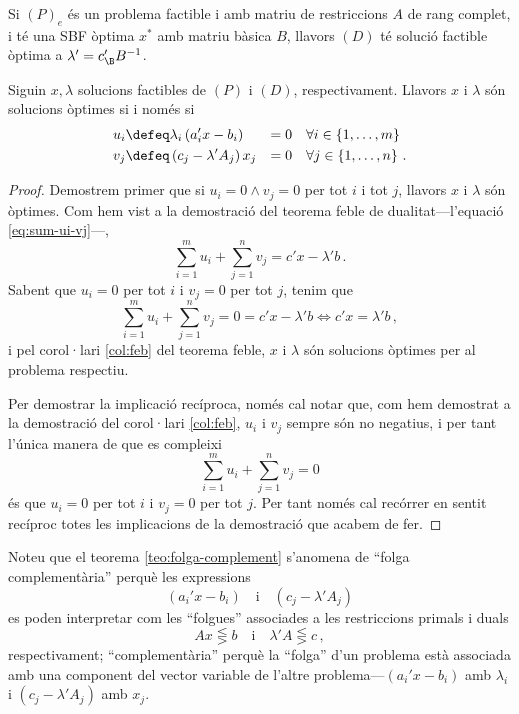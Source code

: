 \begin{col}
    Si $\left(P\right)_e$ és un problema factible i amb matriu de restriccions $A$ de rang complet, i té una SBF òptima $x^\ast$ amb matriu bàsica $B$, llavors $\left(D\right)$ té solució factible òptima a $\lambda' = c_\B'B^{-1}$.
\end{col}

\begin{teo}\label{teo:folga-complement}
    Siguin $x, \lambda$ solucions factibles de $\left(P\right)$ i $\left(D\right)$, respectivament. Llavors $x$ i $\lambda$ són solucions òptimes si i només si
    \begin{alignat*}{2}{}
        u_i &\defeq \lambda_i \left(a_i'x - b_i\right) &= 0 &\quad \forall i \in \left\{1, \dots, m\right\} \\
        v_j &\defeq \left(c_j - \lambda'A_j\right) x_j &= 0 &\quad \forall j \in \left\{1, \dots, n\right\}\,.
    \end{alignat*}
    \begin{proof}
    	Demostrem primer que si $u_i = 0 \land v_j = 0$ per tot $i$ i tot $j$, llavors $x$ i $\lambda$ són òptimes. Com hem vist a la demostració del teorema feble de dualitat---l'equació \eqref{eq:sum-ui-vj}---, 
    	\begin{equation*}
	    	\sum_{i = 1}^{m} u_i + \sum_{j = 1}^{n} v_j = c'x - \lambda'b\,.
    	\end{equation*}
    	Sabent que $u_i = 0$ per tot $i$ i $v_j = 0$ per tot $j$, tenim que \[\sum_{i = 1}^{m} u_i + \sum_{j = 1}^{n} v_j = 0 = c'x - \lambda'b \Leftrightarrow c'x = \lambda'b\,,  \] i pel corol·lari \ref{col:feb} del teorema feble, $x$ i $\lambda$ són solucions òptimes per al problema respectiu.
    	
    	Per demostrar la implicació recíproca, només cal notar que, com hem demostrat a la demostració del corol·lari \ref{col:feb}, $u_i$ i $v_j$ sempre són no negatius, i per tant l'única manera de que es compleixi \[\sum_{i=1}^{m} u_i + \sum_{j=1}^{n} v_j = 0 \] és que $u_i = 0$ per tot $i$ i $v_j = 0$ per tot $j$. Per tant només cal recórrer en sentit recíproc totes les implicacions de la demostració que acabem de fer.
    \end{proof}
\end{teo}

Noteu que el teorema \ref{teo:folga-complement} s'anomena de ``folga complementària'' perquè les expressions \[(a_i'x-b_i) \quad \text{i}\quad (c_j-\lambda'A_j) \] es poden interpretar com les ``folgues'' associades a les restriccions primals i duals \[Ax \lesseqgtr b \quad \text{i}\quad \lambda'A \lesseqgtr c\,,\] respectivament; ``complementària'' perquè la ``folga'' d'un problema està associada amb una component del vector variable de l'altre problema---$(a_i'x-b_i)$ amb $\lambda_i$ i $(c_j-\lambda'A_j)$ amb $x_j$.

